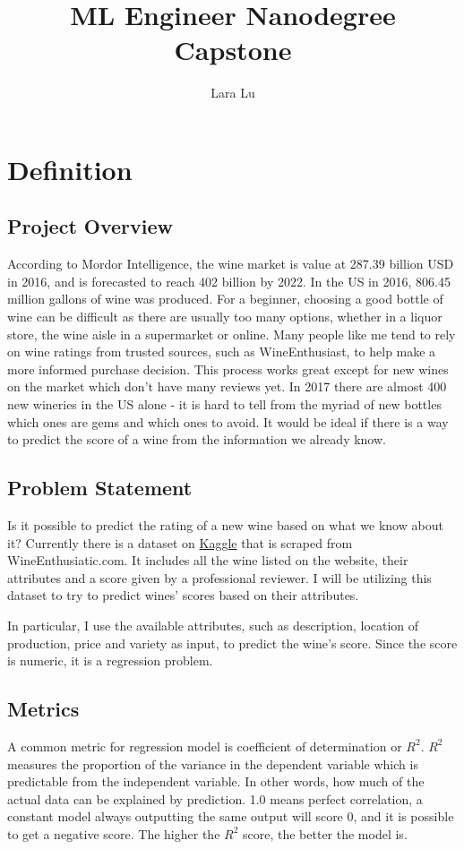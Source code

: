 \documentclass{article}
\begin{document}
\title{ML Engineer Nanodegree Capstone}
\author{Lara Lu}
\maketitle
\section{Definition}
\subsection{Project Overview}
According to Mordor Intelligence, the wine market is value at 287.39 billion USD in 2016, and is forecasted to reach 402 billion by 2022\cite{mordorintelligence}. In the US in 2016, 806.45 million gallons of wine was produced\cite{statistica}.  For a beginner, choosing a good bottle of wine can be difficult as there are usually too many options, whether in a liquor store, the wine aisle in a supermarket or online. Many people like me tend to rely on wine ratings from trusted sources, such as WineEnthusiast, to help make a more informed purchase decision. This process works great except for new wines on the market which don't have many reviews yet. In 2017 there are almost 400 new wineries in the US alone\cite{winebusiness} - it is hard to tell from the myriad of new bottles which ones are gems and which ones to avoid. It would be ideal if there is a way to predict the score of a wine from the information we already know.

\subsection{Problem Statement}
Is it possible to predict the rating of a new wine based on what we know about it? Currently there is a dataset on \href{https://www.kaggle.com/zynicide/wine-reviews/}{Kaggle} that is scraped from WineEnthusiatic.com. It includes all the wine listed on the website, their attributes and a score given by a professional reviewer. I will be utilizing this dataset to try to predict wines' scores based on their attributes.

In particular, I use the available attributes, such as description, location of production, price and variety as input, to predict the wine's score. Since the score is numeric, it is a regression problem.

\subsection{Metrics}
A common metric for regression model is coefficient of determination or $R^2$. $R^2$ measures the proportion of the variance in the dependent variable which is predictable from the independent variable. In other words, how much of the actual data can be explained by prediction. 1.0 means perfect correlation, a constant model always outputting the same output will score 0, and it is possible to get a negative score. The higher the $R^2$ score, the better the model is.
\end{document}
